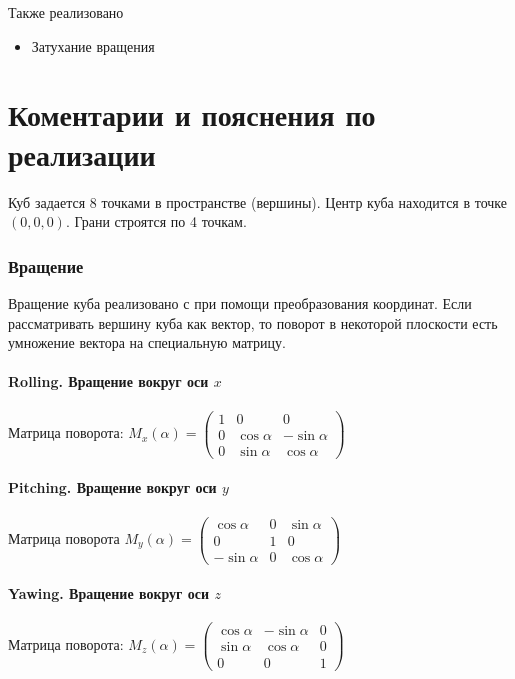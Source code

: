 \documentclass[a4paper,11pt]{article}
\begin{document}
  Также реализовано
  \begin{itemize}
    \item Затухание вращения
  \end{itemize}
  \newpage
  \part{Коментарии и пояснения по реализации}
  Куб задается 8 точками в пространстве (вершины). Центр куба находится в точке $(0,0,0)$. Грани строятся по 4 точкам.
  \section{Вращение}
  Вращение куба реализовано с при помощи преобразования координат. Если рассматривать вершину куба как вектор, то поворот в некоторой плоскости есть умножение вектора на специальную матрицу.
  
  \subsection*{Rolling. Вращение вокруг оси $x$}
  Матрица поворота: $M_x(\alpha) =
  \begin{pmatrix}    
1 &   0           & 0           \\
0 & \cos \alpha   &  -\sin \alpha \\
0 & \sin \alpha & \cos \alpha 
 \end{pmatrix}$
 
  \subsection*{Pitching. Вращение вокруг оси $y$}
Матрица поворота  $M_y(\alpha) = 
\begin{pmatrix} 
\cos \alpha   & 0 & \sin \alpha \\
   0          & 1 &  0          \\
 -\sin \alpha & 0 & \cos \alpha
\end{pmatrix} $
  \subsection*{Yawing. Вращение вокруг оси $z$}
Матрица поворота:  $M_z(\alpha) =
\begin{pmatrix} 
\cos  \alpha  &  -\sin \alpha & 0 \\
\sin \alpha & \cos \alpha & 0 \\
   0          & 0           & 1
\end{pmatrix} $
\end{document}
